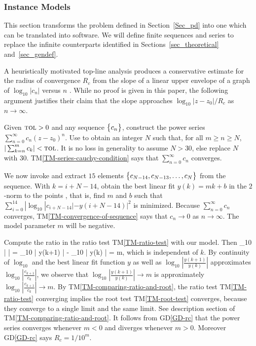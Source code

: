 \documentclass[12pt]{article}
\newcommand{\dref}[1]{GD\ref{#1}}
\newcommand{\tref}[1]{TM\ref{#1}}
\begin{document}
\subsubsection{Instance Models} \label{sec_instance}    
\label{ssc:instance-models}

This section transforms the problem defined in Section~\ref{Sec_pd} into 
one which can be translated into software. We will define finite sequences
and series to replace the infinite counterparts
identified in Sections~\ref{sec_theoretical} and~\ref{sec_gendef}.

A heuristically motivated top-line analysis produces a conservative estimate
for the radius of convergence $R_c$ from the slope of a linear upper envelope
of a graph of $\log_{10} | c_n |$ versus $n$ \cite{chang1982}. While no proof
is given in this paper, the following argument justifies their claim that
the slope approaches $\log_{10} |z - z_0|/R_c$ as $n \rightarrow \infty$.

Given $\text{\sc tol}>0$ and any sequence $\bigl\{ {c_n} \bigr\}$, construct the power series
$\sum_{n=0}^{\infty} c_n (z-z_0)^n$.
Use  to obtain an integer $N$ such that,
for all $m \geq n \geq N$, $| \sum_{k=n}^{m} c_k | < \text{\sc tol}$.
It is no loss in generality to assume $N>30$, else replace $N$ with $30$.
\tref{TM-series-cauchy-condition} says that $\sum_{n=0}^{\infty} c_n$ converges.

We now invoke  and extract $15$ elements 
$\bigl\{ {c_{N-14}, c_{N-13}, \ldots, c_{N}} \bigr\}$ from the sequence.
With $k = i+N-14$, obtain the best linear fit $y(k) = m k + b$ in the $2$-norm to the points
\EQ
{
  \label{eq:approximation-points}
  ,
}
that is, find $m$ and $b$ such that $\sum_{i=0}^{14} |\log_{10} |c_{i+N-14}| - y(i+N-14)|^2$ is minimized.
Because $\sum_{n=0}^{\infty} c_n$ converges, \tref{TM-convergence-of-sequence} says that
$c_n \rightarrow 0$ as $n \rightarrow \infty$. The model parameter $m$ will be negative.

Compute the ratio in the ratio test \tref{TM-ratio-test} with our model. Then 
\EQ
{
  \log_{10} \left|  \right| = \log_{10} | y(k+1) | - \log_{10} | y(k) | = m,
}
which is independent of $k$. By continuity of $\log_{10}$ and the best linear fit function $y$ as well as
$\log_{10} \left| \tfrac{y(k+1)}{y(k)} \right|$ approximates $\log_{10} \left| \tfrac{c_{k+1}}{c_k} \right|$,
we observe that $\log_{10} \left| \tfrac{y(k+1)}{y(k)} \right| \rightarrow m$ is approximately
$\log_{10} \left| \tfrac{c_{k+1}}{c_k} \right| \rightarrow m$. By \tref{TM-comparing-ratio-and-root},
the ratio test \tref{TM-ratio-test} converging implies the root test \tref{TM-root-test} converges, because
they converge to a single limit and the same limit. See description section of \tref{TM-comparing-ratio-and-root}.
It follows from \dref{GD-rc} that the power series converges whenever $m<0$ and diverges whenever $m>0$.
Moreover \dref{GD-rc} says $R_c = 1/10^m$. 
\end{document}

